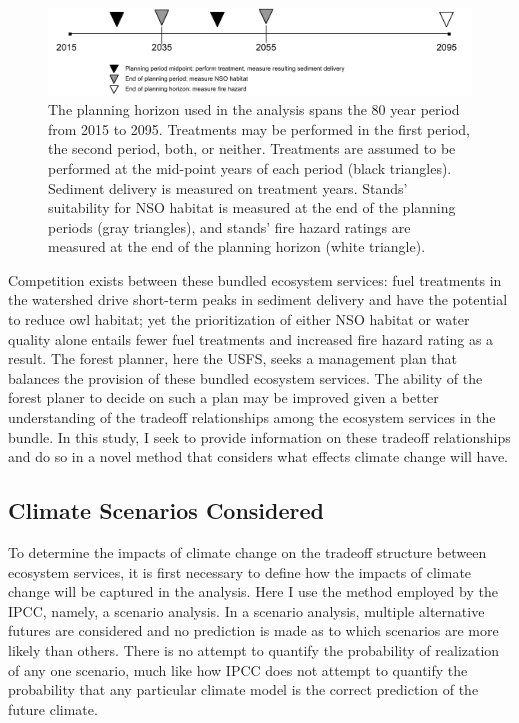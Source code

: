 \begin{figure}
\centering
\includegraphics[width=.85\textwidth]{../images/Drink_PlanningHorizon_Sketch}
\caption[Planning horizon schematic]{The planning horizon used in the analysis spans the 80 year period from 2015 to 2095. Treatments may be performed in the first period, the second period, both, or neither. Treatments are assumed to be performed at the mid-point years of each period (black triangles). Sediment delivery is measured on treatment years. Stands' suitability for NSO habitat is measured at the end of the planning periods (gray triangles), and stands' fire hazard ratings are measured at the end of the planning horizon (white triangle).}
\label{fig:drinkPlanningHorizon}
\end{figure}

Competition exists between these bundled ecosystem services: fuel treatments in the watershed drive short-term peaks in sediment delivery and have the potential to reduce owl habitat; yet the prioritization of either NSO habitat or water quality alone entails fewer fuel treatments and increased fire hazard rating as a result. The forest planner, here the USFS, seeks a management plan that balances the provision of these bundled ecosystem services. The ability of the forest planer to decide on such a plan may be improved given a better understanding of the tradeoff relationships among the ecosystem services in the bundle. In this study, I seek to provide information on these tradeoff relationships and do so in a novel method that considers what effects climate change will have.

\subsection{Climate Scenarios Considered}
To determine the impacts of climate change on the tradeoff structure between ecosystem services, it is first necessary to define how the impacts of climate change will be captured in the analysis. Here I use the method employed by the IPCC, namely, a scenario analysis. In a scenario analysis, multiple alternative futures are considered and no prediction is made as to which scenarios are more likely than others. There is no attempt to quantify the probability of realization of any one scenario, much like how IPCC does not attempt to quantify the probability that any particular climate model is the correct prediction of the future climate.

